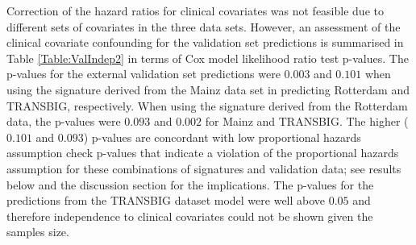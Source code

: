 \documentclass[letterpaper,12pt]{article}
\begin{document}
Correction of the hazard ratios for clinical covariates was not feasible due to different sets of covariates in the three data sets. However, an assessment of the clinical covariate confounding for the validation set predictions is summarised in Table \ref{Table:ValIndep2} in terms of Cox model likelihood ratio test p-values. The p-values for the external validation set predictions were $0.003$ and $0.101$ when using the signature derived from the Mainz data set in predicting Rotterdam and TRANSBIG, respectively. When using the signature derived from the Rotterdam data, the p-values were $0.093$ and $0.002$ for Mainz and TRANSBIG. The higher ($0.101$ and $0.093$) p-values are concordant with low proportional hazards assumption check p-values that indicate a violation of the proportional hazards assumption for these combinations of signatures and validation data; see results below and the discussion section for the implications. The p-values for the predictions from the TRANSBIG dataset model were well above $0.05$ and therefore independence to clinical covariates could not be shown given the samples size.

\end{document}
